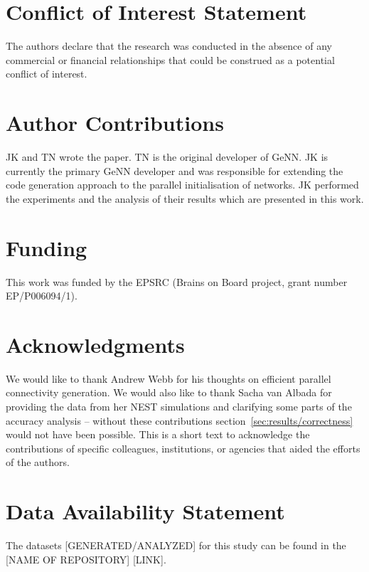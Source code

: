 \documentclass[utf8]{frontiersSCNS} %
\begin{document}
\section*{Conflict of Interest Statement}
The authors declare that the research was conducted in the absence of any commercial or financial relationships that could be construed as a potential conflict of interest.

\section*{Author Contributions}
JK and TN wrote the paper.
TN is the original developer of GeNN.
JK is currently the primary GeNN developer and was responsible for extending the code generation approach to the parallel initialisation of networks.
JK performed the experiments and the analysis of their results which are presented in this work.

\section*{Funding}
This work was funded by the EPSRC (Brains on Board project, grant number EP/P006094/1).

\section*{Acknowledgments}
We would like to thank Andrew Webb for his thoughts on efficient parallel connectivity generation.
We would also like to thank Sacha van Albada for providing the data from her NEST simulations and clarifying some parts of the accuracy analysis -- without these contributions section~\ref{sec:results/correctness} would not have been possible.
This is a short text to acknowledge the contributions of specific colleagues, institutions, or agencies that aided the efforts of the authors.

\section*{Data Availability Statement}
The datasets [GENERATED/ANALYZED] for this study can be found in the [NAME OF REPOSITORY] [LINK].
%



\end{document}
